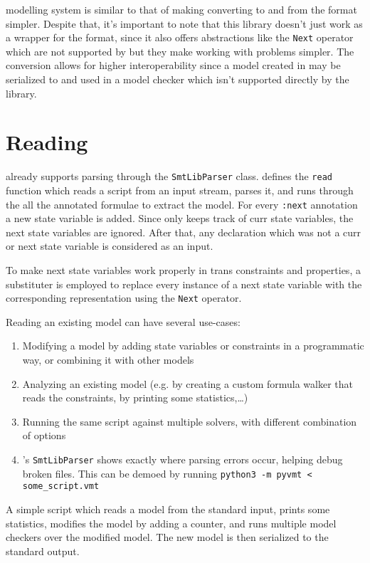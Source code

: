 \pyvmt{} modelling system is similar to that of \vmtlib{} making converting to and from the format simpler.
Despite that, it's important to note that this library doesn't just work as a wrapper for the format, since it also offers abstractions like the \texttt{Next} operator which are not supported by \vmtlib{} but they make working with \vmt{} problems simpler.
The conversion allows for higher interoperability since a model created in \pyvmt{} may be serialized to \vmtlib{} and used in a model checker which isn't supported directly by the library.

\section{Reading}
\pysmt{} already supports parsing \smtlib{} through the \texttt{SmtLibParser} class.
\pyvmt{} defines the \texttt{read} function which reads a script from an input stream, parses it, and runs through the all the annotated formulae to extract the model.
For every \texttt{:next} annotation a new state variable is added. Since \pyvmt{} only keeps track of curr state variables, the next state variables are ignored.
After that, any declaration which was not a curr or next state variable is considered as an input.

To make next state variables work properly in trans constraints and properties, a substituter is employed to replace every instance of a next state variable with the corresponding representation using the \texttt{Next} operator.

Reading an existing \vmtlib{} model can have several use-cases:
\begin{enumerate}
    \item Modifying a model by adding state variables or constraints in a programmatic way, or combining it with other models
    \item Analyzing an existing model (e.g. by creating a custom formula walker that reads the constraints, by printing some statistics,\dots)
    \item Running the same \vmtlib{} script against multiple solvers, with different combination of options
    \item \pysmt{}'s \texttt{SmtLibParser} shows exactly where parsing errors occur, helping debug broken \vmtlib{} files. This can be demoed by running \texttt{python3 -m pyvmt < some_script.vmt}
\end{enumerate}

\begin{listing}
    \label{alg:reading-vmtlib}
    \caption{A simple script which reads a \vmtlib{} model from the standard input, prints some statistics, modifies the model by adding a counter, and runs multiple model checkers over the modified model. The new model is then serialized to the standard output.}
\end{listing}

